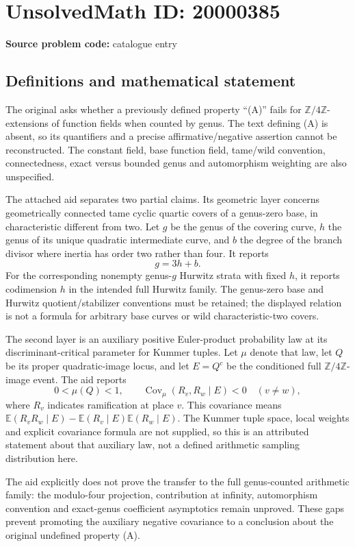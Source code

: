 \documentclass[11pt]{article}
\newcommand{\Z}{\mathbb{Z}}
\newcommand{\E}{\mathbb{E}}
\begin{document}
\section*{UnsolvedMath ID: 20000385}
\textbf{Source problem code:} catalogue entry
\subsection{Definitions and mathematical statement}
The original asks whether a previously defined property ``(A)'' fails for \(\Z/4\Z\)-extensions of function fields when counted by genus. The text defining (A) is absent, so its quantifiers and a precise affirmative/negative assertion cannot be reconstructed. The constant field, base function field, tame/wild convention, connectedness, exact versus bounded genus and automorphism weighting are also unspecified.

The attached aid separates two partial claims. Its geometric layer concerns geometrically connected tame cyclic quartic covers of a genus-zero base, in characteristic different from two. Let \(g\) be the genus of the covering curve, \(h\) the genus of its unique quadratic intermediate curve, and \(b\) the degree of the branch divisor where inertia has order two rather than four. It reports
\[
g=3h+b.
\]
For the corresponding nonempty genus-\(g\) Hurwitz strata with fixed \(h\), it reports codimension \(h\) in the intended full Hurwitz family. The genus-zero base and Hurwitz quotient/stabilizer conventions must be retained; the displayed relation is not a formula for arbitrary base curves or wild characteristic-two covers.

The second layer is an auxiliary positive Euler-product probability law at its discriminant-critical parameter for Kummer tuples. Let \(\mu\) denote that law, let \(Q\) be its proper quadratic-image locus, and let \(E=Q^c\) be the conditioned full \(\Z/4\Z\)-image event. The aid reports
\[
0<\mu(Q)<1,
\qquad\operatorname{Cov}_{\mu}(R_v,R_w\mid E)<0
\quad(v\ne w),
\]
where \(R_v\) indicates ramification at place \(v\). This covariance means
\(\E(R_vR_w\mid E)-\E(R_v\mid E)\E(R_w\mid E)\).
The Kummer tuple space, local weights and explicit covariance formula are not supplied, so this is an attributed statement about that auxiliary law, not a defined arithmetic sampling distribution here.

The aid explicitly does not prove the transfer to the full genus-counted arithmetic family: the modulo-four projection, contribution at infinity, automorphism convention and exact-genus coefficient asymptotics remain unproved. These gaps prevent promoting the auxiliary negative covariance to a conclusion about the original undefined property (A).
\end{document}
